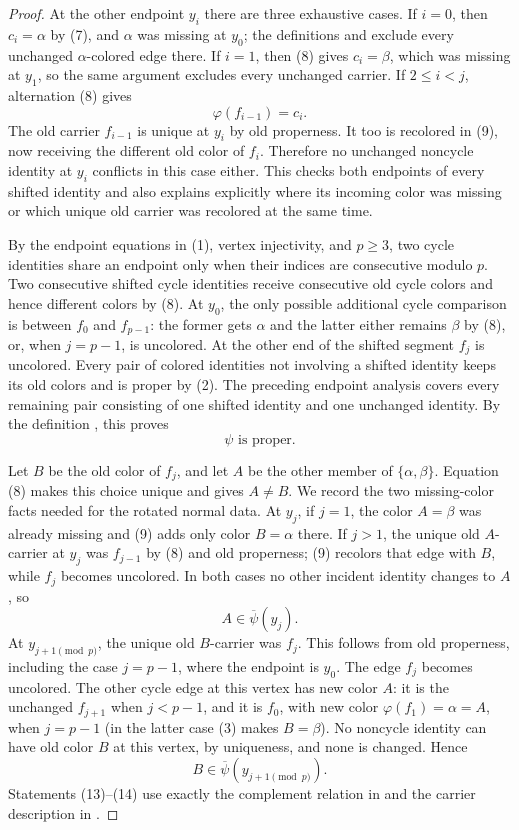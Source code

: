 \begin{proof}
At the other endpoint $y_i$ there are three exhaustive cases.  If $i=0$,
then $c_i=\alpha$ by (7), and $\alpha$ was missing at $y_0$; the
definitions  and  exclude
every unchanged $\alpha$-colored edge there.  If $i=1$, then (8) gives
$c_i=\beta$, which was missing at $y_1$, so the same argument excludes
every unchanged carrier.  If $2\leq i<j$, alternation (8) gives
\[
                    \varphi(f_{i-1})=c_i.                        \tag{11}
\]
The old carrier $f_{i-1}$ is unique at $y_i$ by old properness.  It too is
recolored in (9), now receiving the different old color of $f_i$.
Therefore no unchanged noncycle identity at $y_i$ conflicts in this case
either.  This checks both endpoints of every shifted identity and also
explains explicitly where its incoming color was missing or which unique
old carrier was recolored at the same time.

By the endpoint equations in (1), vertex injectivity, and $p\geq3$, two
cycle identities share an endpoint only when their indices are consecutive
modulo $p$.  Two consecutive shifted cycle identities receive consecutive
old cycle colors and hence different colors by (8).  At $y_0$, the only
possible additional cycle comparison is between $f_0$ and $f_{p-1}$: the former
gets $\alpha$ and the latter either remains $\beta$ by (8), or, when
$j=p-1$, is uncolored.  At the other end of the shifted segment $f_j$ is
uncolored.  Every pair of colored identities not involving a shifted
identity keeps its old colors and is proper by (2).  The preceding
endpoint analysis covers every remaining pair consisting of one shifted
identity and one unchanged identity.  By the definition
, this proves
\[
                         \psi\text{ is proper}.                  \tag{12}
\]

Let $B$ be the old color of $f_j$, and let $A$ be the other member of
$\{\alpha,\beta\}$.  Equation (8) makes this choice unique and gives
$A\ne B$.  We record the two missing-color facts needed for the rotated
normal data.  At $y_j$, if $j=1$, the color $A=\beta$ was already
missing and (9) adds only color $B=\alpha$ there.  If $j>1$, the unique
old $A$-carrier at $y_j$ was $f_{j-1}$ by (8) and old properness; (9)
recolors that edge with $B$, while $f_j$ becomes uncolored.  In both
cases no other incident identity changes to $A$, so
\[
                          A\in\overline\psi(y_j).                 \tag{13}
\]
At $y_{j+1\pmod p}$, the unique old $B$-carrier was $f_j$.  This follows
from old properness, including the case $j=p-1$, where the endpoint is
$y_0$.  The edge $f_j$ becomes uncolored.  The other cycle edge at this
vertex has new color $A$: it is the unchanged $f_{j+1}$ when $j<p-1$,
and it is $f_0$, with new color $\varphi(f_1)=\alpha=A$, when $j=p-1$
(in the latter case (3) makes $B=\beta$).  No noncycle identity can have
old color $B$ at this vertex, by uniqueness, and none is changed.  Hence
\[
                    B\in\overline\psi(y_{j+1\pmod p}).           \tag{14}
\]
Statements (13)--(14) use exactly the complement relation in
 and the carrier description in
.


\end{proof}
